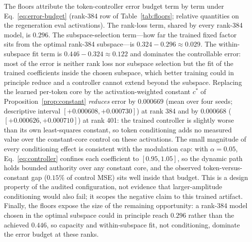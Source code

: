 \begin{table}[t]
\centering\small
\caption{Evaluated floors and constant-core controls on the 2026-11-10
regeneration checkpoints. Token ctl.\ is the trained token-controller FFN;
const.-core replaces every generated core by its activation-weighted
least-squares constant $c^{*}=H^{+}b$ fitted on train-split activations
(Proposition~\ref{prop:constant}); mean-core uses the constant mean of the
generated cores; subspace is the fixed-$V_d$ floor
$\norm{\!Y(I-P_{\mathcal S})\!}_F^2/\norm{Y}_F^2$ of
Theorem~\ref{thm:subspace}; rank tail is the singular-value tail floor
$\sum_{j>r}\sigma_j(Y)^2/\norm{Y}_F^2$. All rows are new CPU evaluations of
the regenerated checkpoints on the regeneration eval activations.}
\label{tab:floors}

\end{table}

The floors attribute the token-controller error budget term by term under
Eq.~\eqref{eq:error-budget} (rank-384 row of Table~\ref{tab:floors}; relative
quantities on the regeneration eval activations). The rank-loss term, shared
by every rank-384 model, is $0.296$. The subspace-selection term---how far
the trained fixed factor sits from the optimal rank-384 subspace---is
$0.324-0.296\approx0.029$. The within-subspace fit term is
$0.446-0.324\approx0.122$ and dominates the controllable error: most of the
error is neither rank loss nor subspace selection but the fit of the trained
coefficients inside the chosen subspace, which better training could in
principle reduce and a controller cannot extend beyond the subspace.
Replacing the learned per-token core by the
activation-weighted constant $c^{*}$ of Proposition~\ref{prop:constant}
\emph{reduces} error by $0.000669$ (mean over four seeds; descriptive
interval $[+0.000608,+0.000730]$) at rank 384 and by $0.000668$
($[+0.000626,+0.000710]$) at rank 401: the trained controller is slightly
worse than its own least-squares constant, so token conditioning adds no
measured value over the constant-core control on these activations. The
small magnitude of every conditioning effect is consistent with the
modulation cap: with $\alpha=0.05$, Eq.~\eqref{eq:controller} confines each
coefficient to $[0.95,1.05]$, so the dynamic path holds bounded authority
over any constant core, and the observed token-versus-constant gap
($0.15\%$ of control MSE) sits well inside that budget. This is a design
property of the audited configuration, not evidence that larger-amplitude
conditioning would also fail; it scopes the negative claim to this trained
artifact. Finally, the floors expose the size of the remaining opportunity:
a rank-384 model chosen in the optimal subspace could in principle reach
$0.296$ rather than the achieved $0.446$, so capacity and within-subspace
fit, not conditioning, dominate the error budget at these ranks.

